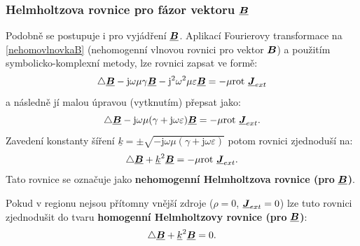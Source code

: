 \documentclass[12pt,a4paper,oneside]{article}
\numberwithin{equation}{section} %
\numberwithin{figure}{section} %
\numberwithin{table}{section} %
\newcommand{\mj}{\mathrm{j}} %
\renewcommand{\vec}[1]{\mbox{\boldmath$#1$}} %
\newcommand{\faz}[1]{{\underline{#1}}} %
\newcommand{\rot}{\mathrm{rot}\ }
\begin{document}
\subsubsection*{Helmholtzova rovnice pro fázor vektoru $\faz{\vec{B}}$}
Podobně se postupuje i pro vyjádření $\faz{\vec{B}}$. Aplikací Fourierovy transformace na \ref{nehomovlnovkaB} (nehomogenní vlnovou rovnici pro vektor $\vec{B}$) a použitím symbolicko-komplexní metody, lze rovnici zapsat ve formě:
\begin{equation}
\triangle \faz{\vec{B}} - \mj \omega \mu \gamma \faz{\vec{B}} - \mj ^2 \omega ^2 \mu \varepsilon \faz{\vec{B}} = - \mu \rot \faz{\vec{J}} _{ext}
\end{equation}
a následně jí malou úpravou (vytknutím) přepsat jako:
\begin{equation}
\triangle \faz{\vec{B}} - \mj \omega \mu (\gamma + \mj \omega \varepsilon) \faz{\vec{B}} = - \mu \rot \faz{\vec{J}} _{ext} .
\end{equation}
Zavedení konstanty šíření $\faz{k} = \pm \sqrt{- \mj \omega \mu (\gamma + \mj \omega \varepsilon)}$ potom rovnici zjednoduší na:
\begin{equation}
\label{HelmholtzBnehomo}
\triangle \faz{\vec{B}} + \faz{k} ^2 \faz{\vec{B}} = - \mu \rot \faz{\vec{J}} _{ext} .
\end{equation}
Tato rovnice se označuje jako \textbf{nehomogenní Helmholtzova rovnice (pro} $\faz{\vec{B}}$\textbf{)}.

Pokud v regionu nejsou přítomny vnější zdroje ($\rho = 0$, $\faz{\vec{J}} _{ext} = 0$) lze tuto rovnici zjednodušit do tvaru \textbf{homogenní Helmholtzovy rovnice (pro} $\faz{\vec{B}}$\textbf{)}:
\begin{equation}
\label{homohelmholtzb}
\triangle \faz{\vec{B}} + \faz{k} ^2 \faz{\vec{B}} = 0 .
\end{equation}
\end{document}
